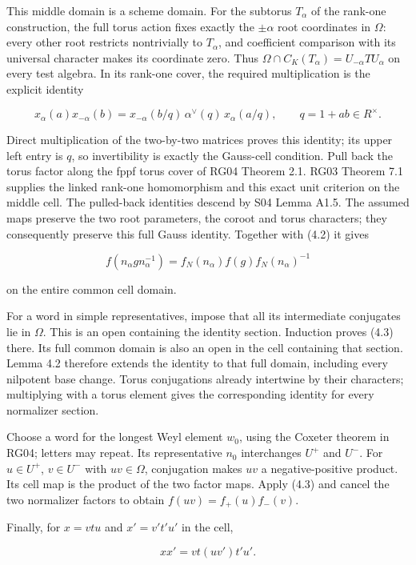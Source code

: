 \documentclass[11pt,a4paper,openany]{report}
\begin{document}
This middle domain is a scheme domain. For the subtorus \(T_\alpha\) of the rank-one construction, the full torus action fixes exactly the \(\pm\alpha\) root coordinates in \(\Omega\): every other root restricts nontrivially to \(T_\alpha\), and coefficient comparison with its universal character makes its coordinate zero. Thus \(\Omega\cap C_K(T_\alpha)=U_{-\alpha}TU_\alpha\) on every test algebra. In its rank-one cover, the required multiplication is the explicit identity

\[
x_\alpha(a)x_{-\alpha}(b)
=x_{-\alpha}(b/q)\,\alpha^\vee(q)\,x_\alpha(a/q),
\qquad q=1+ab\in R^\times.
\]

Direct multiplication of the two-by-two matrices proves this identity; its upper left entry is \(q\), so invertibility is exactly the Gauss-cell condition. Pull back the torus factor along the fppf torus cover of RG04 Theorem 2.1. RG03 Theorem 7.1 supplies the linked rank-one homomorphism and this exact unit criterion on the middle cell. The pulled-back identities descend by S04 Lemma A1.5. The assumed maps preserve the two root parameters, the coroot and torus characters; they consequently preserve this full Gauss identity. Together with (4.2) it gives

\[
f(n_\alpha g n_\alpha^{-1})
=f_N(n_\alpha)f(g)f_N(n_\alpha)^{-1}
\tag{4.3}
\]

on the entire common cell domain.

For a word in simple representatives, impose that all its intermediate conjugates lie in \(\Omega\). This is an open containing the identity section. Induction proves (4.3) there. Its full common domain is also an open in the cell containing that section. Lemma 4.2 therefore extends the identity to that full domain, including every nilpotent base change. Torus conjugations already intertwine by their characters; multiplying with a torus element gives the corresponding identity for every normalizer section.

Choose a word for the longest Weyl element \(w_0\), using the Coxeter theorem in RG04; letters may repeat. Its representative \(n_0\) interchanges \(U^+\) and \(U^-\). For \(u\in U^+\), \(v\in U^-\) with \(uv\in\Omega\), conjugation makes \(uv\) a negative-positive product. Its cell map is the product of the two factor maps. Apply (4.3) and cancel the two normalizer factors to obtain \(f(uv)=f_+(u)f_-(v)\).

Finally, for \(x=vtu\) and \(x'=v't'u'\) in the cell,

\[
xx'=vt(uv')t'u'.
\]
\end{document}
